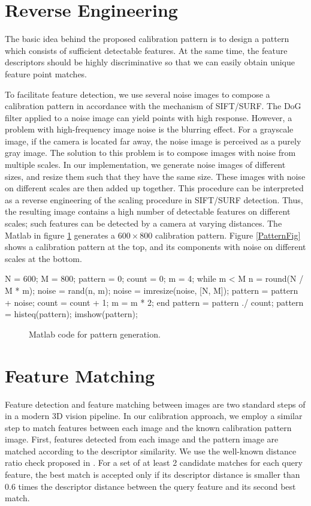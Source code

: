 \documentclass{report}
\begin{document}
\section{Reverse Engineering}
The basic idea behind the proposed calibration pattern is to design a pattern which consists of sufficient detectable features. At the same time, the feature descriptors should be highly discriminative so that we can easily obtain unique feature point matches. 

To facilitate feature detection, we use several noise images to compose a calibration pattern in accordance with the mechanism of SIFT/SURF. The DoG filter applied to a noise image can yield points with high response. However, a problem with high-frequency image noise is the blurring effect. For a grayscale image, if the camera is located far away, the noise image is perceived as a purely gray image. The solution to this problem is to compose images with noise from multiple scales. In our implementation, we generate noise images of different sizes, and resize them such that they have the same size. These images with noise on different scales are then added up together. This procedure can be interpreted as a reverse engineering of the scaling procedure in SIFT/SURF detection. Thus, the resulting image contains a high number of detectable features on different scales; such features can be detected by a camera at varying distances. The Matlab in figure \ref{patternCodeFig} generates a $600 \times 800$ calibration pattern. Figure \ref{PatternFig} shows a calibration pattern at the top, and its components with noise on different scales at the bottom. 

\small
\begin{verbbox}
N = 600; M = 800;
pattern = 0; count = 0;
m = 4;
while m < M
  n = round(N / M * m);
  noise = rand(n, m);
  noise = imresize(noise, [N, M]);
  pattern = pattern + noise;
  count = count + 1;
  m = m * 2;
end
pattern = pattern ./ count;
pattern = histeq(pattern);
imshow(pattern);
\end{verbbox}
\normalsize

\begin{figure}
  \centering
  \theverbbox
  \caption{Matlab code for pattern generation.}
  \label{patternCodeFig}  
\end{figure}


\section{Feature Matching}
Feature detection and feature matching between images are two standard steps of in a modern 3D vision pipeline. In our calibration approach, we employ a similar step to match features between each image and the known calibration pattern image. First, features detected from each image and the pattern image are matched according to the descriptor similarity. We use the well-known distance ratio check proposed in \cite{lowe2004distinctive}. For a set of at least 2 candidate matches for each query feature, the best match is accepted only if its descriptor distance is smaller than 0.6 times the descriptor distance between the query feature and its second best match. 
\end{document}
